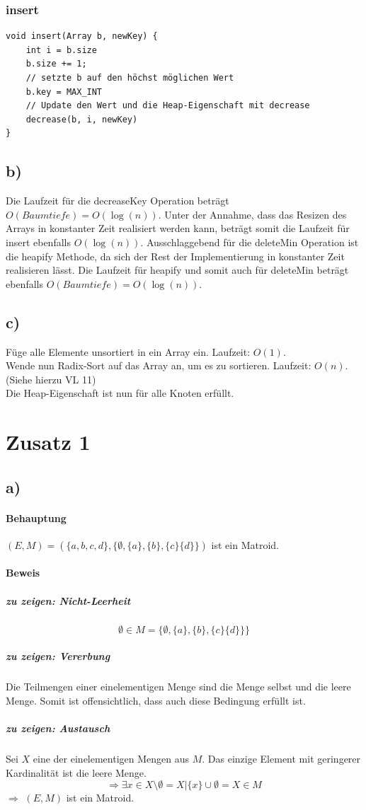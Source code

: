 \documentclass[a4paper,11pt,twoside]{scrartcl}
\begin{document}
\subsubsection*{insert}
\begin{lstlisting}[style=c,basicstyle=\small\ttfamily]
void insert(Array b, newKey) {
	int i = b.size
	b.size += 1;
	// setzte b auf den höchst möglichen Wert
	b.key = MAX_INT 
	// Update den Wert und die Heap-Eigenschaft mit decrease
	decrease(b, i, newKey)
}
\end{lstlisting}


\subsection*{b)}
Die Laufzeit für die decreaseKey Operation beträgt $O(Baumtiefe) = O(\log(n))$. Unter der Annahme, dass das Resizen des Arrays in konstanter Zeit realisiert werden kann, beträgt somit die Laufzeit für insert ebenfalls $O(\log(n))$. Ausschlaggebend für die deleteMin Operation ist die heapify Methode, da sich der Rest der Implementierung in konstanter Zeit realisieren lässt. Die Laufzeit für heapify und somit auch für deleteMin beträgt ebenfalls $O(Baumtiefe) = O(\log(n))$.

\subsection*{c)}
Füge alle Elemente unsortiert in ein Array ein. Laufzeit: $O(1)$.\\
Wende nun Radix-Sort auf das Array an, um es zu sortieren. Laufzeit: $O(n)$. (Siehe hierzu VL 11)\\
Die Heap-Eigenschaft ist nun für alle Knoten erfüllt.

\section*{Zusatz 1}
\subsection*{a)}
\paragraph{Behauptung}
$(E,M) = (\{ a,b,c,d \}, \{ \emptyset,\{ a \},\{ b \},\{ c \}\{ d \}\}  )$ ist ein Matroid.
\paragraph{Beweis}
\subparagraph{zu zeigen: Nicht-Leerheit}
\[ \emptyset\in M=\{  \emptyset,\{ a \},\{ b \},\{ c \}\{ d \}\} \} \]
\subparagraph{zu zeigen: Vererbung}
Die Teilmengen einer einelementigen Menge sind die Menge selbst und die leere Menge. Somit ist offensichtlich, dass auch diese Bedingung erfüllt ist.
\subparagraph{zu zeigen: Austausch}
Sei $X$ eine der einelementigen Mengen aus $M$. Das einzige Element mit geringerer Kardinalität ist die leere Menge.
\[\Rightarrow \exists x\in X\setminus\emptyset=X | \{ x \}\cup\emptyset=X\in M \]
$\Rightarrow$ $(E,M)$ ist ein Matroid.
\end{document}
